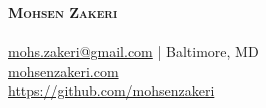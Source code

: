 \documentclass[A4,11pt]{article}
\begin{document}
\begin{comment}
In Europe it is common to include a picture of ones self in the CV. Select
which heading appropriate for the document you are creating.

\begin{minipage}[c]{0.05\textwidth}
\-\
\end{minipage}
\begin{minipage}[c]{0.2\textwidth}
\begin{tikzpicture}
\end{tikzpicture}
\end{minipage}

\end{comment}

\begin{minipage}[c]{0.4\textwidth}
    \textbf{\Huge \scshape{Mohsen Zakeri}} \\ 
    \\
    \href{mailto:mohs.zakeri@gmail.com}{mohs.zakeri@gmail.com} | Baltimore, MD \\
    \href{https://www.mohsenzakeri.com}{mohsenzakeri.com} \\
    \href{https://github.com/mohsenzakeri}{https://github.com/mohsenzakeri}
\end{minipage}

\end{document}
